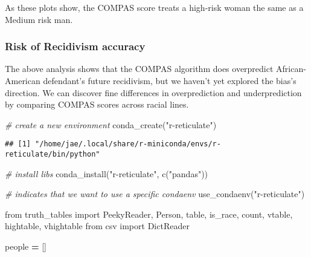 \documentclass[
]{book}
\newenvironment{Shaded}{\begin{snugshade}}{\end{snugshade}}
\newcommand{\CommentTok}[1]{\textcolor[rgb]{0.56,0.35,0.01}{\textit{#1}}}
\newcommand{\FunctionTok}[1]{\textcolor[rgb]{0.00,0.00,0.00}{#1}}
\newcommand{\ImportTok}[1]{#1}
\newcommand{\NormalTok}[1]{#1}
\newcommand{\OperatorTok}[1]{\textcolor[rgb]{0.81,0.36,0.00}{\textbf{#1}}}
\newcommand{\StringTok}[1]{\textcolor[rgb]{0.31,0.60,0.02}{#1}}
\begin{document}
As these plots show, the COMPAS score treats a high-risk woman the same as a Medium risk man.

\hypertarget{risk-of-recidivism-accuracy}{%
\subsubsection{Risk of Recidivism accuracy}\label{risk-of-recidivism-accuracy}}

The above analysis shows that the COMPAS algorithm does overpredict African-American defendant's future recidivism, but we haven't yet explored the bias's direction. We can discover fine differences in overprediction and underprediction by comparing COMPAS scores across racial lines.

\begin{Shaded}
\begin{Highlighting}[]
\CommentTok{\# create a new environment }
\FunctionTok{conda\_create}\NormalTok{(}\StringTok{"r{-}reticulate"}\NormalTok{)}
\end{Highlighting}
\end{Shaded}

\begin{verbatim}
## [1] "/home/jae/.local/share/r-miniconda/envs/r-reticulate/bin/python"
\end{verbatim}

\begin{Shaded}
\begin{Highlighting}[]
\CommentTok{\# install libs }
\FunctionTok{conda\_install}\NormalTok{(}\StringTok{"r{-}reticulate"}\NormalTok{, }\FunctionTok{c}\NormalTok{(}\StringTok{"pandas"}\NormalTok{))}

\CommentTok{\# indicates that we want to use a specific condaenv}
\FunctionTok{use\_condaenv}\NormalTok{(}\StringTok{"r{-}reticulate"}\NormalTok{)}
\end{Highlighting}
\end{Shaded}

\begin{Shaded}
\begin{Highlighting}[]

\ImportTok{from}\NormalTok{ truth\_tables }\ImportTok{import}\NormalTok{ PeekyReader, Person, table, is\_race, count, vtable, hightable, vhightable}
\ImportTok{from}\NormalTok{ csv }\ImportTok{import}\NormalTok{ DictReader}

\NormalTok{people }\OperatorTok{=}\NormalTok{ []}
\end{Highlighting}
\end{Shaded}
\end{document}
